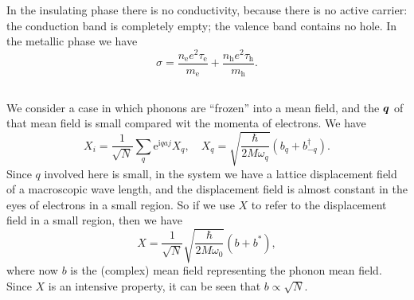 \documentclass[hyperref, a4paper]{article}
\newcommand*{\ii}{\mathrm{i}}
\newcommand*{\ee}{\mathrm{e}}
\begin{document}
In the insulating phase there is no conductivity,
because there is no active carrier:
the conduction band is completely empty;
the valence band contains no hole.
In the metallic phase we have 
\begin{equation}
    \sigma = \frac{n_{\text{e}} e^2 \tau_{\text{e}}}{m_{\text{e}}}
    + \frac{n_{\text{h}} e^2 \tau_{\text{h}}}{m_{\text{h}}}.
\end{equation}

\subsection{}

We consider a case in which phonons are ``frozen'' into a mean field, 
and the $\vb*{q}$ of that mean field is small compared 
wit the momenta of electrons.
We have
\begin{equation}
    X_i = \frac{1}{\sqrt{N}} \sum_q \ee^{\ii q a j} X_q , \quad 
    X_q = \sqrt{\frac{\hbar}{2 M \omega_q}} (b_q + b_{-q}^\dagger).
\end{equation}
Since $q$ involved here is small, 
in the system we have a lattice displacement field 
of a macroscopic wave length,
and the displacement field is almost constant in the eyes 
of electrons in a small region.
So if we use $X$ to refer to the displacement field in a small region, 
then we have 
\begin{equation}
    X = \frac{1}{\sqrt{N}} \sqrt{\frac{\hbar}{2 M \omega_0}} (b + b^*),
\end{equation}
where now $b$ is the (complex) mean field 
representing the phonon mean field.
Since $X$ is an intensive property,
it can be seen that $b \propto \sqrt{N}$.
\end{document}
